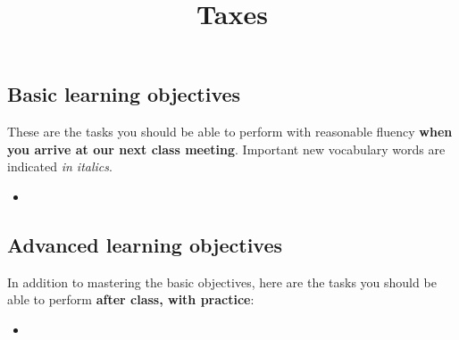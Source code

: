 \documentclass{ximera}
\title{Taxes}
\begin{document}
\begin{abstract}

\end{abstract}
\maketitle

\subsection*{Basic learning objectives}

These are the tasks you should be able to perform with reasonable fluency \textbf{when you arrive at our next class meeting}. Important new vocabulary words are indicated \emph{in italics}. 

\begin{itemize}
	\item 
\end{itemize}

\subsection*{Advanced learning objectives}

In addition to mastering the basic objectives, here are the tasks you should be able to perform \textbf{after class, with practice}: 

\begin{itemize}
	\item 
\end{itemize}
\end{document}
